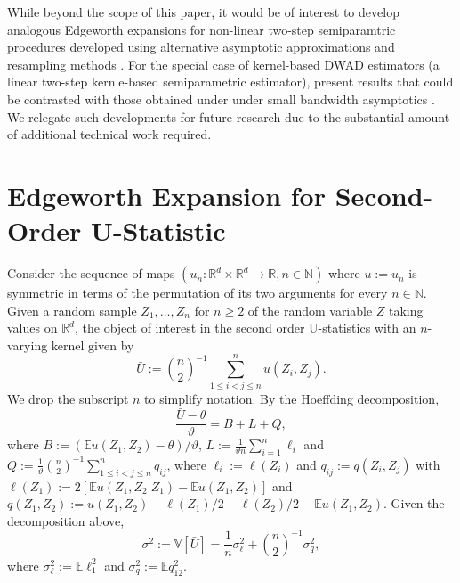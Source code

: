 \documentclass[11pt]{article}
\numberwithin{equation}{section}
\theoremstyle{definition}
\newcommand{\E}{\mathbb{E}}
\newcommand{\V}{\mathbb{V}}
\newcommand{\R}{\mathbb{R}}
\newcommand{\N}{\mathbb{N}}
\newcommand{\Center}{\theta}
\newcommand{\Scale}{\vartheta}
\begin{document}
While beyond the scope of this paper, it would be of interest to develop analogous Edgeworth expansions for non-linear two-step semiparamtric procedures developed using alternative asymptotic approximations and resampling methods \citep{Cattaneo-Crump-Jansson_2013_JASA,Cattaneo-Jansson_2018_ECMA,Cattaneo-Jansson-Ma_2019_RESTUD}. For the special case of kernel-based DWAD estimators (a linear two-step kernle-based semiparametric estimator), \citet{Nishiyama-Robinson_2005_ECMA} present results that could be contrasted with those obtained under under small bandwidth asymptotics \citep{Cattaneo-Crump-Jansson_2014b_ET}. We relegate such developments for future research due to the substantial amount of additional technical work required.


\appendix



\section{Edgeworth Expansion for Second-Order U-Statistic}\label{App A: General EE Standarized}

Consider the sequence of maps $(u_n: \R^d\times\R^d \to\R, n\in \N)$ where $u:=u_n$ is symmetric in terms of the permutation of its two arguments for every $n\in\N$. Given a random sample $Z_1,\dots, Z_n$ for $n\geq 2$ of the random variable $Z$ taking values on $\R^d$, the object of interest in the second order U-statistics with an $n$-varying kernel given by
\begin{equation}\label{E:U-statistic}
    \bar{U} :=\binom{n}{2}^{-1}\sum_{1\leq i< j\leq n}^n u(Z_i,Z_j).
\end{equation}
We drop the subscript $n$ to simplify notation. By the Hoeffding decomposition,
\[\frac{\bar{U}-\Center}{\Scale} = B + L + Q,\]
where $B:= (\E u(Z_1,Z_2)-\Center)/\Scale$, $L:= \frac{1}{\Scale n}\sum_{i=1}^n\ell_i$ and $Q:= \frac{1}{\Scale}\binom{n}{2}^{-1}\sum_{1\leq i< j\leq n}^n q_{ij}$, where $\ell_i:=\ell(Z_i)$ and $q_{ij}:=q(Z_i,Z_j)$ with $\ell(Z_1) :=  2[\E u(Z_1,Z_2|Z_1) - \E u(Z_1,Z_2)]$ and $q(Z_1,Z_2) := u(Z_1,Z_2) -\ell(Z_1)/2 - \ell(Z_2)/2 - \E u(Z_1,Z_2)$. Given the decomposition above,
\begin{equation}\label{E:variance_decomposition}
    \sigma^2:= \V[\bar{U}]= \frac{1}{n} \sigma_{\ell}^2 + \binom{n}{2}^{-1}\sigma_{q}^2,
\end{equation}
where $\sigma_{\ell}^2:=\E \ell^2_1$ and $\sigma_{q}^2:=\E q^2_{12}$.
\end{document}
